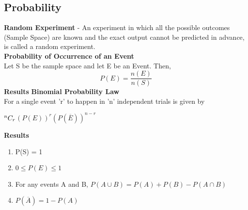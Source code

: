 \subsection{Probability}
\textbf{Random Experiment} - An experiment in which all the possible outcomes (Sample Space) are known and the exact output cannot be predicted in advance, is called a random experiment.\\
\textbf{Probability of Occurrence of an Event}\\
Let S be the sample space and let E be an Event. Then,
\[P(E)=\frac{n(E)}{n(S)}\]
\textbf{Results}
\textbf{Binomial Probability Law}\\
For a single event 'r' to happen in 'n' independent trials is given by
\begin{center}
${}^{n}C_{r}$\((P(E))^r(P(\overline{E}))^{n-r}\)
\end{center}
\textbf{Results}
\begin{enumerate}
    \item P(S) = 1
    \item \(0 \leq P(E) \leq 1\)
    \item For any events A and B, \(P(A \cup B) = P(A) + P(B) - P(A \cap B)\)
    \item \(P(\overline{A})=1-P(A)\)
\end{enumerate}

